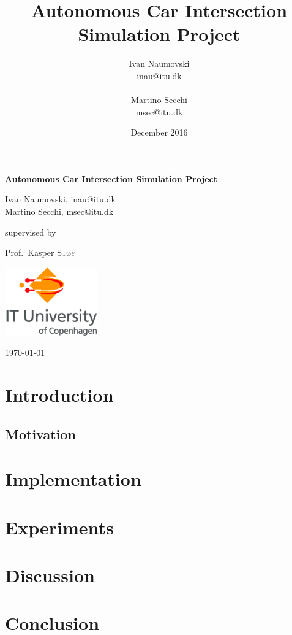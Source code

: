 \documentclass[titlepage]{article}
\title{Autonomous Car Intersection Simulation Project}
\author{
   Ivan Naumovski\\
    {inau@itu.dk}\\
    \\
   Martino Secchi\\
    {msec@itu.dk}\\
}
\date{December 2016}
\begin{document}

\begin{titlepage}
	\centering

	{\huge\bfseries Autonomous Car Intersection Simulation Project \par}
	\vspace{2cm}
	{\Large Ivan Naumovski, {inau@itu.dk}\\ Martino Secchi, {msec@itu.dk}\\\par}
	\vfill
	supervised by\par
	\large Prof.~Kasper \textsc{St\o y}

	\vfill
	\includegraphics[width=0.3\textwidth]{img/itulogo.jpg}\par\vspace{1cm}
	{\large \today\par}
\end{titlepage}

\clearpage
\tableofcontents
\clearpage


\abstract{

}
\section{Introduction}


\subsection{Motivation}


\section{Implementation}


\section{Experiments}


\section{Discussion}


\section{Conclusion}




\end{document}
